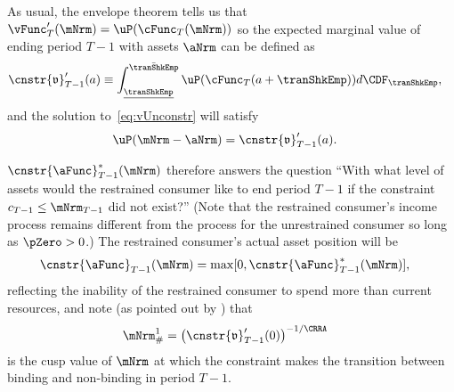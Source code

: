 \documentclass[\econtexRoot/BufferStockTheory]{subfiles}
\begin{document}
As usual, the envelope theorem tells us that $\vFunc_{T}^{\prime}(\mNrm)=\uP(\cFunc_{T}(\mNrm))$ so the expected marginal value of ending period $T-1$ with assets $\aNrm$ can be defined as
\begin{equation}\begin{gathered}\begin{aligned}
      \cnstr{\mathfrak{v}}_{T-1}^{\prime}(a)  & \equiv  \int_{\underline{\tranShkEmp}}^{\bar{\tranShkEmp}} \uP(\cFunc_{T}(a+\tranShkEmp)) d\CDF_{\tranShkEmp}, \notag
    \end{aligned}\end{gathered}\end{equation}
and the solution to~\eqref{eq:vUnconstr} will satisfy
\begin{equation}\begin{gathered}\begin{aligned}
      \uP(\mNrm-\aNrm)  & =  \cnstr{\mathfrak{v}}_{T-1}^{\prime}(a) \label{eq:uPConstr}.
    \end{aligned}\end{gathered}\end{equation}

$\cnstr{\aFunc}_{T-1}^{*}(\mNrm)$ therefore answers the question ``With what level of assets would the restrained consumer like to end period $T-1$ if the constraint $c_{T-1} \leq \mNrm_{T-1}$ did not exist?''  (Note that the restrained consumer's income process remains different from the process for the unrestrained consumer so long as $\pZero>0$.)
The restrained consumer's actual asset position will be
\begin{equation}\begin{gathered}\begin{aligned}
      \cnstr{\aFunc}_{T-1}(\mNrm)  & = \max[0,\cnstr{\aFunc}^{*}_{T-1}(\mNrm)], \notag
    \end{aligned}\end{gathered}\end{equation}
reflecting the inability of the restrained consumer to spend more than current resources, and note (as pointed out by \cite{deatonLiqConstr}) that
\begin{equation}\begin{gathered}\begin{aligned}
      \mNrm^{1}_{\#}  & = {\left( \cnstr{\mathfrak{v}}_{T-1}^{\prime}(0)\right)}^{-1/\CRRA} \notag
    \end{aligned}\end{gathered}\end{equation}
is the cusp value of $\mNrm$ at which the constraint makes the
transition between binding and non-binding in period $T-1$.
\end{document}
